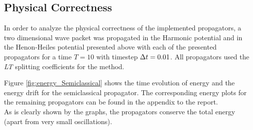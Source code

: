 \subsection{Physical Correctness}
\label{subsec:physical}
%
In order to analyze the physical correctness of the implemented propagators, a two dimensional wave packet was propagated in the Harmonic potential and in the Henon-Heiles potential presented above with each of the presented propagators for a time $T = 10$ with timestep $\Delta t = 0.01$.
All propagators used the \emph{LT} splitting coefficients for the  method.
\par\medskip
%
%
Figure \ref{fig:energy_Semiclassical} shows the time evolution of energy and the energy drift for the semiclassical propagator. The corresponding energy plots for the remaining propagators can be found in the appendix to the report. \\
As is clearly shown by the graphs, the propagators conserve the total energy (apart from very small oscillations).
%
